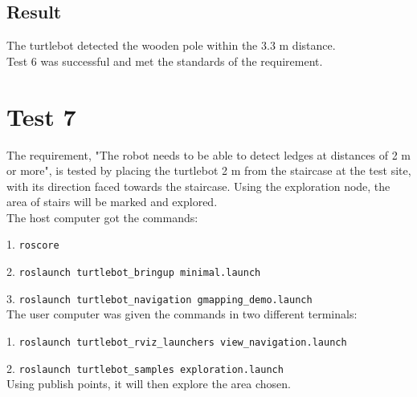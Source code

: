 \subsection{Result}
The turtlebot detected the wooden pole within the 3.3 m distance.\\
Test 6 was successful and met the standards of the requirement.

%
%
%
%

\section{Test 7} 
The requirement, "The robot needs to be able to detect ledges at distances of 2 m or more", is tested by placing the turtlebot 2 m from the staircase at the test site, with its direction faced towards the staircase. Using the exploration node, the area of stairs will be marked and explored.\\ 
\newline
The host computer got the commands:

1. \texttt{roscore} 

2. \texttt{roslaunch turtlebot\_bringup minimal.launch}

3. \texttt{roslaunch turtlebot\_navigation gmapping\_demo.launch}\\
The user computer was given the commands in two different terminals:

1. \texttt{roslaunch turtlebot\_rviz\_launchers view\_navigation.launch}

2. \texttt{roslaunch turtlebot\_samples exploration.launch}\\
Using publish points, it will then explore the area chosen.

